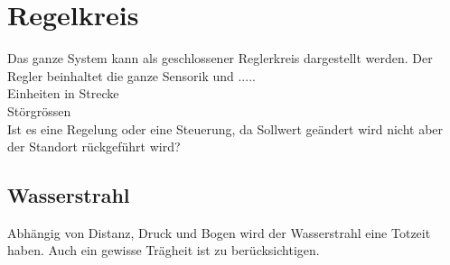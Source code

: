 

\section{Regelkreis}

Das ganze System kann als geschlossener Reglerkreis dargestellt werden. Der Regler beinhaltet die ganze Sensorik und .....\\
Einheiten in Strecke\\
Störgrössen\\
Ist es eine Regelung oder eine Steuerung, da Sollwert geändert wird nicht aber der Standort rückgeführt wird?\\

	\subsection{Wasserstrahl}
	Abhängig von Distanz, Druck und Bogen wird der Wasserstrahl eine Totzeit haben. Auch ein gewisse Trägheit ist zu berücksichtigen.
	